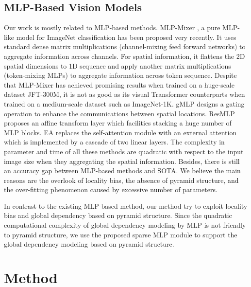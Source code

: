 \documentclass[letterpaper]{article} \usepackage{aaai22}  \usepackage{times}  \usepackage{helvet}  \usepackage{courier}  \usepackage[hyphens]{url}  \usepackage{graphicx} \usepackage{color}
\begin{document}
\subsection{MLP-Based Vision Models}
Our work is mostly related to MLP-based methods. MLP-Mixer \cite{tolstikhin2021mlp}, a pure MLP-like model for ImageNet classification has been proposed very recently. It uses standard dense matrix multiplications (channel-mixing feed forward networks) to aggregate information across channels. For spatial information, it flattens the 2D spatial dimensions to 1D sequence and apply another matrix multiplications (token-mixing MLPs) to aggregate information across token sequence. Despite that MLP-Mixer has achieved promising results when trained on a huge-scale dataset JFT-300M, it is not as good as its visual Transformer counterparts when trained on a medium-scale dataset such as ImageNet-1K. gMLP \cite{liu2021pay} designs a gating operation to enhance the communications between spatial locations. ResMLP \cite{touvron2021resmlp} proposes an affine transform layer which facilities stacking a huge number of MLP blocks. EA \cite{guo2021beyond} replaces the self-attention module with an external attention which is implemented by a cascade of two linear layers. The complexity in parameter and time of all these methods are quadratic with respect to the input image size when they aggregating the spatial information. Besides, there is still an accuracy gap between MLP-based methods and SOTA. We believe the main reasons are the overlook of locality bias, the absence of pyramid structure, and the over-fitting phenomenon caused by excessive number of parameters. 


In contrast to the existing MLP-based method, our method try to exploit locality bias and global dependency based on pyramid structure. Since the quadratic computational complexity of global dependency modeling by MLP is not friendly to pyramid structure, we use the proposed sparse MLP module to support the global dependency modeling based on pyramid structure.


\section{Method}
\end{document}
